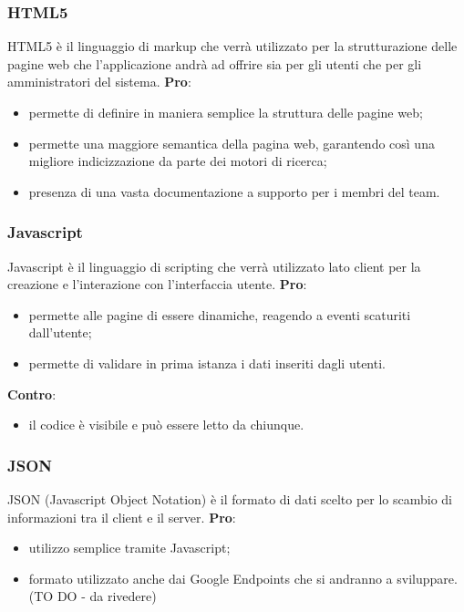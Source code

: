 		\subsubsection{HTML5} %
		\label{ssub:html}
		HTML5 è il linguaggio di markup che verrà utilizzato per la strutturazione delle pagine web che l'applicazione andrà ad offrire sia per gli utenti che per gli amministratori del sistema. \newline
		\textbf{Pro}:
			\begin{itemize}
				\item permette di definire in maniera semplice la struttura delle pagine web;
				\item permette una maggiore semantica della pagina web, garantendo così una migliore indicizzazione da parte dei motori di ricerca;
				\item presenza di una vasta documentazione a supporto per i membri del team.
			\end{itemize}
			\noindent

		\subsubsection{Javascript} %
		\label{ssub:javascript}
		Javascript è il linguaggio di scripting che verrà utilizzato lato client per la creazione e l'interazione con l'interfaccia utente. \newline
		\textbf{Pro}:
			\begin{itemize}
				\item permette alle pagine di essere dinamiche, reagendo a eventi scaturiti dall'utente;
				\item permette di validare in prima istanza i dati inseriti dagli utenti.
			\end{itemize}
		\noindent
		\newline
		\textbf{Contro}:
			\begin{itemize}
				\item il codice è visibile e può essere letto da chiunque.
			\end{itemize}
			\noindent

		\subsubsection{JSON} %
		\label{ssub:json}
		JSON (Javascript Object Notation) è il formato di dati scelto per lo scambio di informazioni tra il client e il server. \newline
		\textbf{Pro}:
			\begin{itemize}
				\item utilizzo semplice tramite Javascript;
				\item formato utilizzato anche dai Google Endpoints che si andranno a sviluppare. (TO DO - da rivedere)
			\end{itemize}
			\noindent

